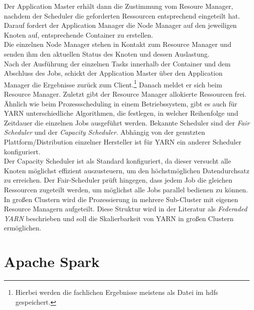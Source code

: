 \noindent
Der Application Master erhält dann die Zustimmung vom Resoure Manager, nachdem der Scheduler die geforderten Ressourcen entsprechend eingeteilt hat. Darauf fordert der Application Manager die Node Manager auf den jeweiligen Knoten auf, entsprechende Container zu erstellen.\\
Die einzelnen Node Manager stehen in Kontakt zum Resource Manager und senden ihm den aktuellen Status des Knoten und dessen Auslastung. \\
Nach der Ausführung der einzelnen Tasks innerhalb der Container und dem Abschluss des Jobs, schickt der Application Master über den Application Manager die Ergebnisse zurück zum Client.\footnote{Hierbei werden die fachlichen Ergebnisse meistens als Datei im \gls{hdfs} gespeichert.} Danach meldet er sich beim Resource Manager. Zuletzt gibt der Resource Manager allokierte Ressourcen frei.\\


\noindent
Ähnlich wie beim Prozessscheduling in einem Betriebssystem, gibt es auch für YARN unterschiedliche Algorithmen, die festlegen, in welcher Reihenfolge und Zeitdauer die einzelnen Jobs ausgeführt werden. Bekannte Scheduler sind der \textit{Fair Scheduler} und der \textit{Capacity Scheduler}. Abhängig von der genutzten Plattform/Distribution einzelner Hersteller ist für YARN ein anderer Scheduler konfiguriert.\\
Der Capacity Scheduler ist als Standard konfiguriert, da dieser versucht alle Knoten möglichst effizient auszusteuern, um den höchstmöglichen Datendurchsatz zu erreichen. Der Fair-Scheduler prüft hingegen, dass jedem Job die gleichen Ressourcen zugeteilt werden, um möglichst alle Jobs parallel bedienen zu können.\\

\noindent
In großen Clustern wird die Prozessierung in mehrere Sub-Cluster mit eigenen Resource Managern aufgeteilt. Diese Struktur wird in der Literatur als \textit{Federaded YARN} beschrieben und soll die Skalierbarkeit von YARN in großen Clustern ermöglichen.

\section{Apache Spark}
\label{sec:theory_spark}

